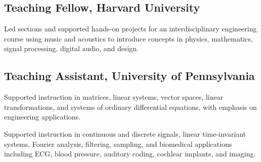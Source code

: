\documentclass[12pt,legalpaper,sans]{vendor/moderncv/moderncv} %
\begin{document}
\subsection{Teaching Fellow, Harvard University}
Led sections and supported hands-on projects for an interdisciplinary engineering course using music and acoustics to introduce concepts in physics, mathematics, signal processing, digital audio, and design.

\subsection{Teaching Assistant, University of Pennsylvania}
Supported instruction in matrices, linear systems, vector spaces, linear transformations, and systems of ordinary differential equations, with emphasis on engineering applications.

Supported instruction in continuous and discrete signals, linear time-invariant systems, Fourier analysis, filtering, sampling, and biomedical applications including ECG, blood pressure, auditory coding, cochlear implants, and imaging.





\clearpage
\end{document}
